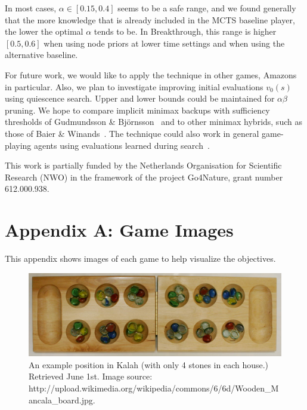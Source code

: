 \documentclass{article}
\begin{document}
In most cases, $\alpha \in [0.15,0.4]$ seems to be a safe range, and we found generally 
that the more knowledge that is already included in the MCTS baseline player, the lower
the optimal $\alpha$ tends to be. In Breakthrough, this range is higher $[0.5,0.6]$ 
when using node priors at lower time settings and when using the alternative baseline. 

For future work, we would like to apply the technique in other games, Amazons in 
particular. 
Also, we plan to investigate improving initial evaluations $v_0(s)$ using quiescence search.
Upper and lower bounds could be maintained for $\alpha\beta$ pruning.
We hope to compare implicit minimax backups with sufficiency thresholds 
of Gudmundsson \& Bj\"{o}rnsson~\cite{Gudmindsson13Sufficiency} and to other 
minimax hybrids, such as those of Baier \& Winands~\cite{Baier13MinimaxHybrids}. 
The technique could also work in general game-playing agents using 
evaluations learned during search~\cite{Finnsson10Learning}.

{\small
{} This work is partially funded by the Netherlands 
Organisation for Scientific Research (NWO) in the framework of the project Go4Nature, grant number 612.000.938. 
}


%
%




\vspace{20cm}

\appendix

\section{Appendix A: Game Images}
\label{app:images}

This appendix shows images of each game to help visualize the objectives.


\begin{figure}[h!]
\begin{center}
\includegraphics[scale=0.21]{images/kalah2}
\end{center}
\caption{An example position in Kalah (with only 4 stones in each house.) 
Retrieved June 1st.
Image source: http://upload.wikimedia.org/wikipedia/commons/6/6d/Wooden\_Mancala\_board.jpg. \label{fig:kalah-image}}
\end{figure}
\end{document}
